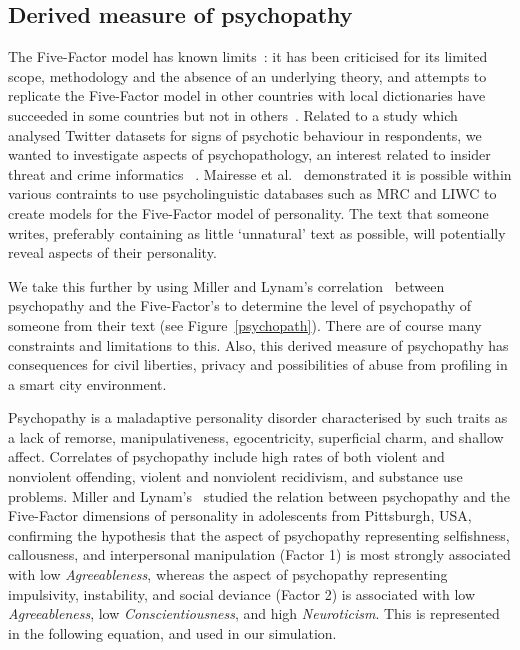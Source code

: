 \documentclass[conference]{IEEEtran}
\begin{document}
\subsection{Derived measure of psychopathy}

The Five-Factor model has known
limits~\cite{eysenck:1992,paunonen+jackson:2000,block:2010}: it has
been criticised for its limited scope, methodology and the absence of
an underlying theory, and attempts to replicate the Five-Factor model
in other countries with local dictionaries have succeeded in some
countries but not in
others~\cite{szirmak+deraad:1994,defruyt-et-al:2004}. Related to a
study which analysed Twitter datasets for signs of psychotic behaviour
in respondents, we wanted to investigate aspects of psychopathology,
an interest related to insider threat and crime informatics
~\cite{oatley+crick:2014,oatley+crick_asonam2014,oatley+crick_fosintsi2014,oatley+crick:2015}.
Mairesse et al.~\cite{mairesse-et-al:2007} demonstrated it is possible
within various contraints to use psycholinguistic databases such as
MRC and LIWC to create models for the Five-Factor model of
personality. The text that someone writes, preferably containing as
little `unnatural' text as possible, will potentially reveal aspects
of their personality.

We take this further by using Miller and Lynam's
correlation~\cite{miller+lynam:2003,lynam-et-al:2005} between
psychopathy and the Five-Factor's to determine the level of
psychopathy of someone from their text (see
Figure~\ref{psychopath}). There are of course many constraints and
limitations to this. Also, this derived measure of psychopathy has
consequences for civil liberties, privacy and possibilities of abuse
from profiling in a smart city environment.

Psychopathy is a maladaptive personality disorder characterised by
such traits as a lack of remorse, manipulativeness, egocentricity,
superficial charm, and shallow affect. Correlates of psychopathy
include high rates of both violent and nonviolent offending, violent
and nonviolent recidivism, and substance use problems. Miller and
Lynam's~\cite{miller+lynam:2003,lynam-et-al:2005} studied the relation
between psychopathy and the Five-Factor dimensions of personality in
adolescents from Pittsburgh, USA, confirming the hypothesis that the
aspect of psychopathy representing selfishness, callousness, and
interpersonal manipulation (Factor 1) is most strongly associated with
low {\emph{Agreeableness}}, whereas the aspect of psychopathy
representing impulsivity, instability, and social deviance (Factor 2)
is associated with low {\emph{Agreeableness}}, low
{\emph{Conscientiousness}}, and high {\emph{Neuroticism}}. This is
represented in the following equation, and used in our simulation.
\end{document}
